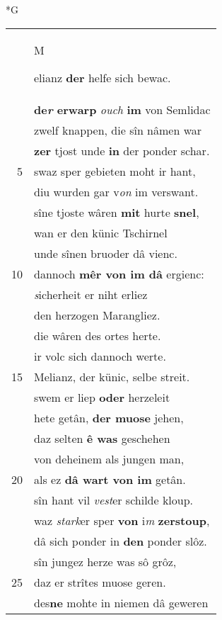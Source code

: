 \documentclass[8pt,a4paper,notitlepage]{article}
\begin{document}
\newpage
\begin{table}[ht]
\begin{minipage}[t]{0.5\linewidth}
\small
\begin{center}*G
\end{center}
\begin{tabular}{rl}
 & \begin{large}M\end{large}elianz \textbf{der} helfe sich bewac.\\ 
 & \textbf{de\textit{r} erwarp} \textit{ouch} \textbf{im} von Semlidac\\ 
 & zwelf knappen, die sîn nâmen war\\ 
 & \textbf{zer} tjost unde \textbf{in} der ponder schar.\\ 
5 & swaz sper gebieten moht ir hant,\\ 
 & diu wurden gar v\textit{on} im verswant.\\ 
 & sîne tjoste wâren \textbf{mit} hurte \textbf{snel},\\ 
 & wan er den künic Tschirnel\\ 
 & unde sînen bruoder dâ vienc.\\ 
10 & dannoch \textbf{mêr von im dâ} ergienc:\\ 
 & \textit{s}icherheit er niht erliez\\ 
 & den herzogen Marangliez.\\ 
 & die wâren des ortes herte.\\ 
 & ir volc sich dannoch werte.\\ 
15 & Melianz, der künic, selbe streit.\\ 
 & swem er liep \textbf{oder} herzeleit\\ 
 & hete getân, \textbf{der muose} jehen,\\ 
 & daz selten \textbf{ê was} geschehen\\ 
 & von deheinem als jungen man,\\ 
20 & als ez \textbf{dâ wart von im} getân.\\ 
 & sîn hant vil \textit{vest}er schilde kloup.\\ 
 & waz \textit{stark}er sper \textbf{von} i\textit{m} \textbf{zerstoup},\\ 
 & dâ sich ponder in \textbf{den} ponder slôz.\\ 
 & sîn jungez herze was sô grôz,\\ 
25 & daz er strîtes muose geren.\\ 
 & des\textbf{ne} mohte in niemen dâ geweren\\ 

\end{tabular}
\end{minipage}
\end{table}
\end{document}
